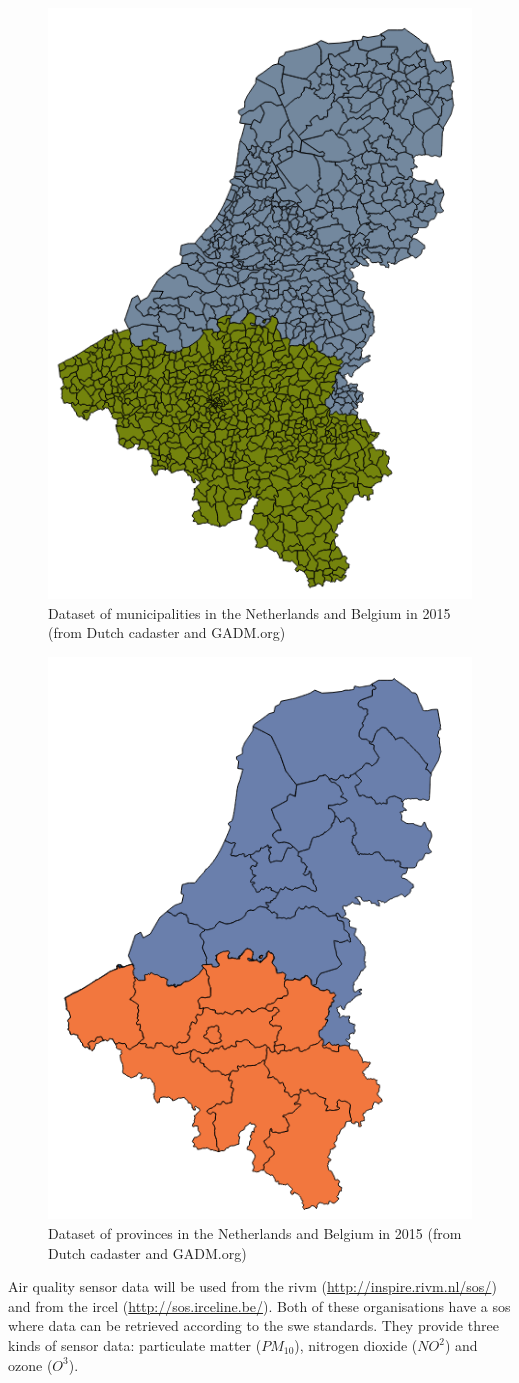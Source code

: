 \begin{figure}
	\centering
	\includegraphics[width=0.5\linewidth]{figs/Municipalities.png}
	\caption{Dataset of municipalities in the Netherlands and Belgium in 2015 (from Dutch cadaster and GADM.org)}
	\label{fig:municipalities}
\end{figure}

\begin{figure}
	\centering
	\includegraphics[width=0.5\linewidth]{figs/Provinces.png}
	\caption{Dataset of provinces in the Netherlands and Belgium in 2015 (from Dutch cadaster and GADM.org)}
	\label{fig:provinces}
\end{figure}

Air quality sensor data will be used from the \ac{rivm} (\url{http://inspire.rivm.nl/sos/}) and from the \ac{ircel} (\url{http://sos.irceline.be/}). Both of these organisations have a \ac{sos} where data can be retrieved according to the \ac{swe} standards. They provide three kinds of sensor data: particulate matter ($PM_{10}$), nitrogen dioxide ($NO^{2}$) and ozone ($O^{3}$).


